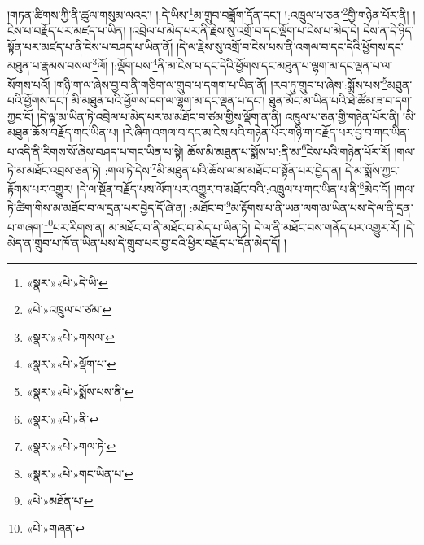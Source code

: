 །གཏན་ཚིགས་ཀྱི་ནི་ཚུལ་གསུམ་ལའང་། །:དེ་ཡིས་\footnote{«སྣར་»«པེ་»དེ་ཡི་}མ་གྲུབ་བཟློག་དོན་དང་། །:འཁྲུལ་པ་ཅན་\footnote{«པེ་»འཁྲུལ་པ་ཙམ་}གྱི་གཉེན་པོར་ནི། །ངེས་པ་བརྗོད་པར་མཛད་པ་ཡིན། །འབྲེལ་པ་མེད་པར་ནི་རྗེས་སུ་འགྲོ་བ་དང་ལྡོག་པ་ངེས་པ་མེད་དེ། དེས་ན་དེ་ཉིད་སྟོན་པར་མཛད་པ་ནི་ངེས་པ་བཤད་པ་ཡིན་ནོ། །དེ་ལ་རྗེས་སུ་འགྲོ་བ་ངེས་པས་ནི་འགལ་བ་དང་དེའི་ཕྱོགས་དང་མཐུན་པ་རྣམས་བསལ་\footnote{«སྣར་»«པེ་»གསལ་}ལོ། །:ལྡོག་པས་\footnote{«སྣར་»«པེ་»ལྡོག་པ་}ནི་མ་ངེས་པ་དང་དེའི་ཕྱོགས་དང་མཐུན་པ་ལྷག་མ་དང་ལྡན་པ་ལ་སོགས་པའོ། །གཉི་ག་ལ་ཞེས་བྱ་བ་ནི་གཅིག་ལ་གྲུབ་པ་དགག་པ་ཡིན་ནོ། །རབ་ཏུ་གྲུབ་པ་ཞེས་:སྨོས་པས་\footnote{«སྣར་»«པེ་»སྨོས་པས་ནི་}མཐུན་པའི་ཕྱོགས་དང་། མི་མཐུན་པའི་ཕྱོགས་དག་ལ་ལྷག་མ་དང་ལྡན་པ་དང་། ཐུན་མོང་མ་ཡིན་པའི་ཐེ་ཚོམ་ཟ་བ་དག་ཀྱང་ངོ། །དེ་ལྟ་མ་ཡིན་ཏེ་འབྲེལ་པ་མེད་པར་མ་མཐོང་བ་ཙམ་གྱིས་ལྡོག་ན་ནི། འཁྲུལ་པ་ཅན་གྱི་གཉེན་པོར་ནི། །མི་མཐུན་ཆོས་བརྗོད་གང་ཡིན་པ། །རེ་ཞིག་འགལ་བ་དང་མ་ངེས་པའི་གཉེན་པོར་གཉི་ག་བརྗོད་པར་བྱ་བ་གང་ཡིན་པ་འདི་ནི་རིགས་སོ་ཞེས་བཤད་པ་གང་ཡིན་པ་སྟེ། ཆོས་མི་མཐུན་པ་སྨོས་པ་:ནི་མ་\footnote{«སྣར་»«པེ་»ནི་}ངེས་པའི་གཉེན་པོར་རོ། །གལ་ཏེ་མ་མཐོང་འབྲས་ཅན་ཏེ། :གལ་ཏེ་དེས་\footnote{«སྣར་»«པེ་»གལ་ཏེ་}མི་མཐུན་པའི་ཆོས་ལ་མ་མཐོང་བ་སྟོན་པར་བྱེད་ན། དེ་མ་སྨོས་ཀྱང་རྟོགས་པར་འགྱུར། །དེ་ལ་སྔོན་བརྗོད་པས་ལོག་པར་འགྱུར་བ་མཐོང་བའི་:འཁྲུལ་པ་གང་ཡིན་པ་ནི་\footnote{«སྣར་»«པེ་»གང་ཡིན་པ་}མེད་དོ། །གལ་ཏེ་ཚིག་གིས་མ་མཐོང་བ་ལ་དྲན་པར་བྱེད་དོ་ཞེ་ན། :མཐོང་བ་\footnote{«པེ་»མཐོན་པ་}མ་རྟོགས་པ་ནི་ཡན་ལག་མ་ཡིན་པས་དེ་ལ་ནི་དྲན་པ་གཞག་\footnote{«པེ་»གཞན་}པར་རིགས་ན། མ་མཐོང་བ་ནི་མཐོང་བ་མེད་པ་ཡིན་ཏེ། དེ་ལ་ནི་མཐོང་བས་གནོད་པར་འགྱུར་རོ། །དེ་མེད་ན་གྲུབ་པ་ཁོ་ན་ཡིན་པས་དེ་གྲུབ་པར་བྱ་བའི་ཕྱིར་བརྗོད་པ་དོན་མེད་དོ། །
